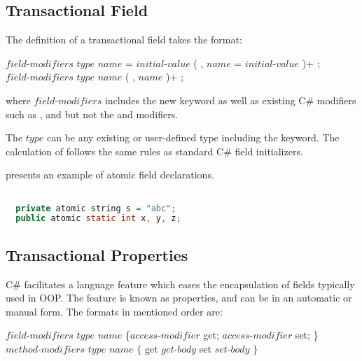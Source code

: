 \subsection{Transactional Field}
The definition of a transactional field takes the format:

$field$-$modifiers$ $type$ $name$ = $initial$-$value$ ( , $name$ = $initial$-$value$ )+ ; \\
$field$-$modifiers$ $type$ $name$ ( , $name$ )+ ;

where $field$-$modifiers$ includes the new  keyword as well as existing C\# modifiers such as ,  and  but not the  and  modifiers. 

The $type$ can be any existing or user-defined type including the  keyword. The calculation of  follows the same rules as standard C\# field initializers\cite[p. 40]{sestoft2011c}.

 presents an example of atomic field declarations.

\begin{lstlisting}[label=lst:design_transactional_fields,
  caption={Local Transactional Variable},
  language=Java,  
  showspaces=false,
  showtabs=false,
  breaklines=true,
  showstringspaces=false,
  breakatwhitespace=true,
  commentstyle=\color{greencomments},
  keywordstyle=\color{bluekeywords},
  stringstyle=\color{redstrings},
  morekeywords={atomic, retry, orElse, var, get, set}]  % Start your code-block

  private atomic string s = "abc";
  public atomic static int x, y, z;
\end{lstlisting}

\subsection{Transactional Properties}
C\# facilitates a language feature which eases the encapsulation of fields typically used in \ac{OOP}. The feature is known as properties, and can be in an automatic or manual form. The formats in mentioned order are\cite[p. 65]{sestoft2011c}:

$field$-$modifiers$ $type$ $name$ \{$access$-$modifier$ get; $access$-$modifier$ set; \}\\
$method$-$modifiers$ $type$ $name$ $\{$ get $get$-$body$ set $set$-$body$ $\}$


